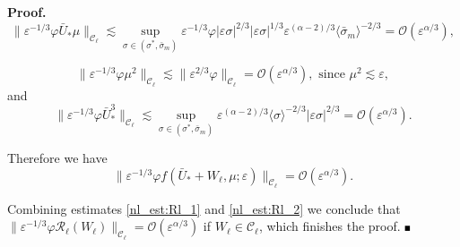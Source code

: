 \documentclass[letterpaper,11pt]{article}
\newcommand{\rmO}{\mathcal{O}}
\newcommand{\eps}{\varepsilon}
\newcommand{\lar}{ \lesssim }
\numberwithin{equation}{section}
\theoremstyle{plain}
\newenvironment{Proof}[1][.]%
 {\begin{trivlist}\item[]\textbf{Proof#1 }}%
 {\hspace*{\fill}$\rule{0.3\baselineskip}{0.35\baselineskip}$\end{trivlist}}
\begin{document}
\begin{Proof}
\[
\|\eps^{-1/3}\varphi \bar{U}_*\mu \|_{\mathcal{C}_\ell} \lar \sup_{\sigma \in (\sigma^{*},\bar{\sigma}_m)} \eps^{-1/3}\varphi |\eps\sigma|^{2/3}|\eps\sigma|^{1/3}\eps^{(\alpha-2)/3}\langle \bar{\sigma}_m\rangle^{-2/3}  = \rmO(\eps^{\alpha/3}),
\]

\[
\|\eps^{-1/3}\varphi \mu^2 \|_{\mathcal{C}_\ell} \lar \|\eps^{2/3}\varphi \|_{\mathcal{C}_\ell}= \rmO(\eps^{\alpha/3}), \text{ since } \mu^2 \lar \eps,
\]
and 
\[
\|\eps^{-1/3}\varphi \bar{U}_*^3 \|_{\mathcal{C}_\ell}  \lar \sup_{\sigma \in (\sigma^{*},\bar{\sigma}_m)}\eps^{(\alpha-2)/3}\langle \sigma\rangle^{-2/3} |\eps \sigma|^{2/3} = \rmO(\eps^{\alpha/3}).
\]

Therefore we have
\begin{equation}\label{nl_est:Rl_2}
\|\eps^{-1/3}\varphi f(\bar{U}_*+W_\ell, \mu ;\eps)\|_{\mathcal{C}_\ell} = \rmO(\eps^{\alpha/3}).
\end{equation}

Combining estimates \eqref{nl_est:Rl_1} and \eqref{nl_est:Rl_2} we conclude that $\|\eps^{-1/3}\varphi \mathcal{R}_\ell(W_\ell)\|_{\mathcal{C}_\ell} = \rmO(\eps^{\alpha/3})$ if $W_\ell \in \mathcal{C}_\ell$, which finishes the proof.
\end{Proof}
\end{document}
